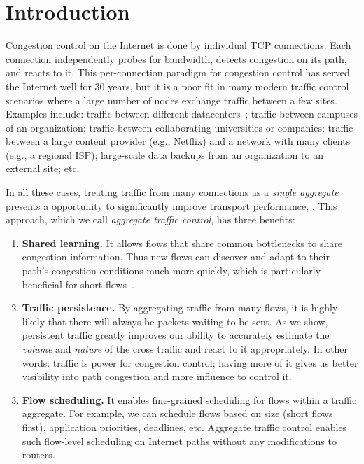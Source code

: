 \section{Introduction}\label{s:intro}

Congestion control on the Internet is done by individual TCP connections. 
Each connection independently probes for bandwidth, detects congestion on its path, and reacts to it. 
This per-connection paradigm for congestion control has served the Internet well for 30 years, but it is a poor fit in many modern traffic control scenarios where a large number of nodes exchange traffic between a few sites. 
Examples include: traffic between different datacenters~\cite{b4, swan}; traffic between campuses of an organization; traffic between collaborating universities or companies; traffic between a large content provider (e.g., Netflix) and a network with many clients (e.g., a regional ISP); large-scale data backups from an organization to an external site; etc. 

In all these cases, treating traffic from many connections as a {\em single aggregate} presents a opportunity to significantly improve transport performance, . This approach, which we call {\em aggregate traffic control}, has three benefits: 
\begin{enumerate}
    \item {\bf Shared learning.} It allows flows that share common bottlenecks to share congestion information. Thus new flows can discover and adapt to their path's congestion conditions much more quickly, which is particularly beneficial for short flows~\cite{CM}. 
    
    \item {\bf Traffic persistence.} By aggregating traffic from many flows, it is highly likely that there will always be packets waiting to be sent. As we show, persistent traffic greatly improves our ability to accurately estimate the {\em volume} and {\em nature} of the cross traffic and react to it appropriately. 
    In other words: traffic is power for congestion control; having more of it gives us better visibility into path congestion and more influence to control it. 
    
    \item {\bf Flow scheduling.} It enables fine-grained scheduling for flows within a traffic aggregate. For example, we can schedule flows based on size (short flows first), application priorities, deadlines, etc. Aggregate traffic control enables such flow-level scheduling on Internet paths without any modifications to routers.
\end{enumerate}

